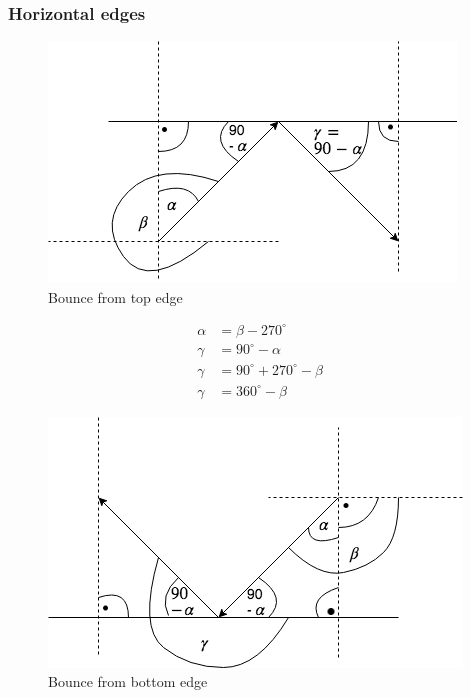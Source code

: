 \documentclass[]{report}
\begin{document}
\subsubsection{Horizontal edges}
\begin{figure}[H]
	\centering
	\includegraphics[height=0.4\linewidth]{topEdge}
	\caption{Bounce from top edge}
	\label{fig:top_edge}
	\end{figure}
\begin{equation}
\begin{aligned}
\label{eq:top_edge}
\alpha &= \beta - 270^{\circ} \\
\gamma &= 90^{\circ} - \alpha \\
\gamma &= 90^{\circ} + 270^{\circ} - \beta \\
\gamma &= 360^{\circ} - \beta
\end{aligned}
\end{equation}
\begin{figure}[H]
	\centering
	\includegraphics[height=0.4\linewidth]{bottomEdge}
	\caption{Bounce from bottom edge}
	\label{fig:bottom_edge}
\end{figure}
\end{document}
